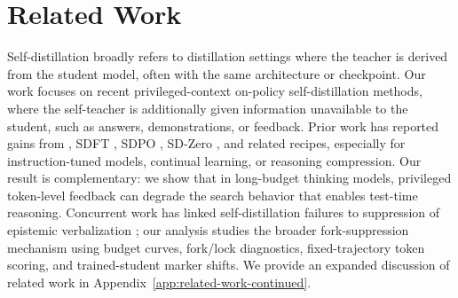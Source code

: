 \section{Related Work}
\label{sec:relatedwork}

Self-distillation broadly refers to distillation settings where the teacher is
derived from the student model, often with the same architecture or checkpoint.
Our work focuses on recent privileged-context on-policy self-distillation
methods, where the self-teacher is additionally given information unavailable
to the student, such as answers, demonstrations, or feedback. Prior work has
reported gains from \opsd{}
\citep{zhao2026selfdistilledreasoneronpolicyselfdistillation}, SDFT
\citep{shenfeld2026self}, SDPO \citep{hubotter2026reinforcement}, SD-Zero
\citep{he2026selfdistillationzero}, and related recipes, especially for
instruction-tuned models, continual learning, or reasoning compression. Our
result is complementary: we show that in long-budget thinking models,
privileged token-level feedback can degrade the search behavior that enables
test-time reasoning. Concurrent work has linked self-distillation failures to
suppression of epistemic verbalization
\citep{kim2026doesselfdistillationsometimesdegrade}; our analysis studies the
broader fork-suppression mechanism using budget curves, fork/lock diagnostics,
fixed-trajectory token scoring, and trained-student marker shifts. We provide
an expanded discussion of related work in
Appendix~\ref{app:related-work-continued}.
